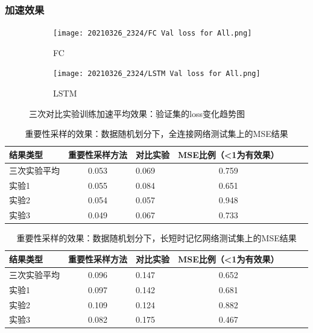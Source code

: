   \subsubsection{加速效果}
  \begin{figure}
    \centering
    \begin{subfigure}[b]{0.45\textwidth}
      \centering
      \texttt{[image: 20210326\_2324/FC Val loss for All.png]}
      \caption{FC}
      \label{fig:FC Val loss for All}
    \end{subfigure}
    \hfill
    \begin{subfigure}[b]{0.45\textwidth}
        \centering
        \texttt{[image: 20210326\_2324/LSTM Val loss for All.png]}
        \caption{LSTM}
        \label{fig:LSTM Val loss for All}
    \end{subfigure}
    \caption{三次对比实验训练加速平均效果：验证集的loss变化趋势图}
    \label{fig:importance-sampling-performance}
  \end{figure}

  \begin{table}
    \centering
    \caption{重要性采样的效果：数据随机划分下，全连接网络测试集上的MSE结果}
    \begin{tabular}{lclclcl}
      \toprule
      结果类型       & 重要性采样方法 & 对比实验 & MSE比例（<1为有效果）                                     \\
      \midrule
      三次实验平均   & 0.053 & 0.069 & 0.759 \\
      实验1    & 0.055 & 0.084 & 0.651                                \\
      实验2 & 0.054 & 0.057 & 0.948                                     \\
      实验3 & 0.049 & 0.067 & 0.733                  \\
      \bottomrule
    \end{tabular}
    \label{tab:fc random test mses}
  \end{table}

  \begin{table}
    \centering
    \caption{重要性采样的效果：数据随机划分下，长短时记忆网络测试集上的MSE结果}
    \begin{tabular}{lclclcl}
      \toprule
      结果类型       & 重要性采样方法 & 对比实验 & MSE比例（<1为有效果）                                       \\
      \midrule
      三次实验平均   & 0.096 &  0.147 & 0.652 \\
      实验1    & 0.097 &  0.142 & 0.681 \\
      实验2 & 0.109 & 0.124 & 0.882                                     \\
      实验3 & 0.082 & 0.175 & 0.467                  \\
      \bottomrule
    \end{tabular}
    \label{tab:lstm random test mses}
  \end{table}

